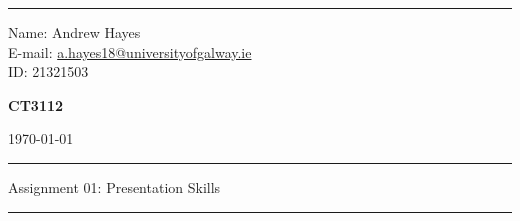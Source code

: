 \documentclass[a4paper]{article}
\begin{document}
\hrule \medskip
\begin{minipage}{0.295\textwidth} 
    \raggedright
    \footnotesize 
    Name: Andrew Hayes \\
    E-mail: \href{mailto://a.hayes18@universityofgalway.ie}{a.hayes18@universityofgalway.ie}  \hfill\\   
    ID: 21321503 \hfill
\end{minipage}
\begin{minipage}{0.4\textwidth} 
    \centering 
    \vspace{0.4em}
    \Large 
    \textbf{CT3112} \\ 
\end{minipage}
\begin{minipage}{0.295\textwidth} 
    \raggedleft
    \today
\end{minipage}
\medskip\hrule 
\begin{center}
    \normalsize
    Assignment 01: Presentation Skills
\end{center}
\hrule
\end{document}
